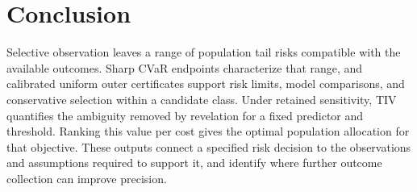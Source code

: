 \section{Conclusion}
\label{sec:conclusion}
Selective observation leaves a range of population tail risks compatible with the available outcomes. Sharp CVaR endpoints characterize that range, and calibrated uniform outer certificates support risk limits, model comparisons, and conservative selection within a candidate class. Under retained sensitivity, TIV quantifies the ambiguity removed by revelation for a fixed predictor and threshold. Ranking this value per cost gives the optimal population allocation for that objective. These outputs connect a specified risk decision to the observations and assumptions required to support it, and identify where further outcome collection can improve precision.
